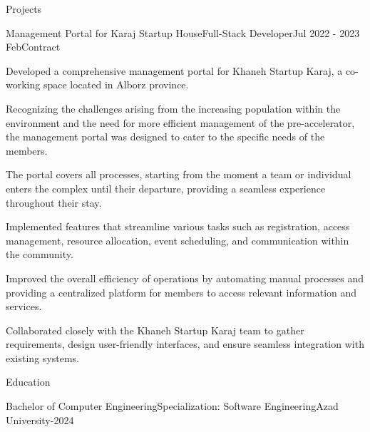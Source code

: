 \documentclass[]{kyvernitis-resume}
\begin{document}
\begin{section}{Projects}
\begin{subsection}{Management Portal for Karaj Startup House}{Full-Stack Developer}{Jul 2022 - 2023 Feb}{Contract}{}
     		\item Developed a comprehensive management portal for Khaneh Startup Karaj, a co-working space located in Alborz province.
		\item Recognizing the challenges arising from the increasing population within the environment and the need for more efficient management of the pre-accelerator, the management portal was designed to cater to the specific needs of the members.
		\item The portal covers all processes, starting from the moment a team or individual enters the complex until their departure, providing a seamless experience throughout their stay.
		\item Implemented features that streamline various tasks such as registration, access management, resource allocation, event scheduling, and communication within the community.
		\item Improved the overall efficiency of operations by automating manual processes and providing a centralized platform for members to access relevant information and services.
		\item Collaborated closely with the Khaneh Startup Karaj team to gather requirements, design user-friendly interfaces, and ensure seamless integration with existing systems.
    \end{subsection}


    
\end{section}






\begin{section}{Education}

   \begin{subsectionnobullet}{Bachelor of Computer Engineering}{Specialization: Software Engineering}{Azad University-2024}{}
        \italicitem{}
    \end{subsectionnobullet}
    
\end{section}
\end{document}
